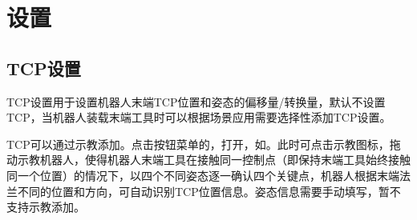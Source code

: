 \section{设置}
\subsection{TCP设置}
TCP设置用于设置机器人末端TCP位置和姿态的偏移量/转换量，默认不设置TCP，当机器人装载末端工具时可以根据场景应用需要选择性添加TCP设置。

TCP可以通过示教添加。点击按钮菜单的，打开，如。此时可点击示教图标，拖动示教机器人，使得机器人末端工具在接触同一控制点（即保持末端工具始终接触同一个位置）的情况下，以四个不同姿态逐一确认四个关键点，机器人根据末端法兰不同的位置和方向，可自动识别TCP位置信息。姿态信息需要手动填写，暂不支持示教添加。

